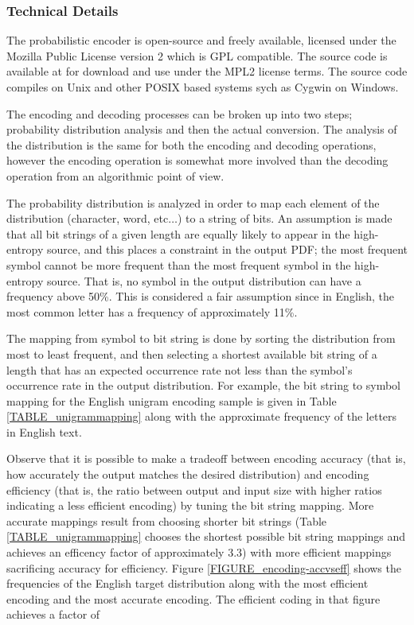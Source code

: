 \documentclass[12pt]{report}
\theoremstyle{remark}
\theoremstyle{definition}
\theoremstyle{definition}
\theoremstyle{definition}
\begin{document}
\begin{appendices}
\subsubsection{Technical Details}
The probabilistic encoder is open-source and freely available, licensed under the Mozilla Public License version 2 which is GPL compatible. The source code is available at \cite{probcodesrc} for download and use under the MPL2 license terms. The source code compiles on Unix and other POSIX based systems sych as Cygwin on Windows.

The encoding and decoding processes can be broken up into two steps; probability distribution analysis and then the actual conversion. The analysis of the distribution is the same for both the encoding and decoding operations, however the encoding operation is somewhat more involved than the decoding operation from an algorithmic point of view.

The probability distribution is analyzed in order to map each element of the distribution (character, word, etc$\ldots$) to a string of bits. An assumption is made that all bit strings of a given length are equally likely to appear in the high-entropy source, and this places a constraint in the output PDF; the most frequent symbol cannot be more frequent than the most frequent symbol in the high-entropy source. That is, no symbol in the output distribution can have a frequency above 50\%. This is considered a fair assumption since in English, the most common letter has a frequency of approximately 11\%.

The mapping from symbol to bit string is done by sorting the distribution from most to least frequent, and then selecting a shortest available bit string of a length that has an expected occurrence rate not less than the symbol's occurrence rate in the output distribution. For example, the bit string to symbol mapping for the English unigram encoding sample is given in Table \ref{TABLE_unigrammapping} along with the approximate frequency of the letters in English text.

Observe that it is possible to make a tradeoff between encoding accuracy (that is, how accurately the output matches the desired distribution) and encoding efficiency (that is, the ratio between output and input size with higher ratios indicating a less efficient encoding) by tuning the bit string mapping. More accurate mappings result from choosing shorter bit strings (Table \ref{TABLE_unigrammapping} chooses the shortest possible bit string mappings and achieves an efficency factor of approximately 3.3) with more efficient mappings sacrificing accuracy for efficiency. Figure \ref{FIGURE_encoding-accvseff} shows the frequencies of the English target distribution along with the most efficient encoding and the most accurate encoding. The efficient coding in that figure achieves a factor of


\end{appendices}
\end{document}

